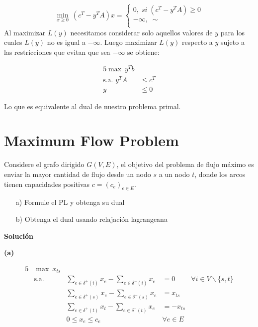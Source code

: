 \documentclass[10pt]{article}
\theoremstyle{plain}
\theoremstyle{definition}
\begin{document}
 \[
    \underset{x\geq0}{\min}\ (c^{T}-y^{T}A)x = \left\{\begin{array}{lr}
        0, \; si \;(c^{T}-y^{T}A)\geq 0\\
        -\infty, \; \sim\\
        \end{array}
  \]
Al maximizar $L(y)$ necesitamos considerar solo aquellos valores de $y$ para los cuales $L(y)$ no es igual a $-\infty$. Luego maximizar $L(y)$ respecto a $y$ sujeto a las restricciones que evitan que sea $-\infty$ se obtiene:

\begin{center}
\begin{alignat*}{5}
\max\  y^{T}b\\
\text{s.a. }  y^{T}A&\leq c^{T}\\
y&\leq 0
\end{alignat*}
\end{center}

Lo que es equivalente al dual de nuestro problema primal.
\section{Maximum Flow Problem}

Considere el grafo dirigido $G(V,E)$, el objetivo del problema de flujo máximo es enviar la mayor cantidad de flujo desde un nodo $s$ a un nodo $t$, donde los arcos tienen capacidades positivas $c = (c_{e})_{e \in E}$.
\begin{itemize}
    \item[a)] Formule el PL y obtenga su dual
    \item[b)] Obtenga el dual usando relajación lagrangeana
\end{itemize}
\textbf{Solución}

\textbf{(a)}\\
\begin{center}
\begin{alignat*}{5}
&\max\ x_{ts}\\
&\text{s.a. } &  \sum_{e\in\delta^{+}(i)}x_{e}-\sum_{e\in\delta^{-}(i)}x_{e} &=0  &\forall i\in V\backslash \{s,t\}\\
&&\sum_{e\in\delta^{+}(s)}x_{e}-\sum_{e\in\delta^{-}(s)}x_{e} &= x_{ts} \\
&&\sum_{e\in\delta^{+}(t)}x_{t}-\sum_{e\in\delta^{-}(t)}x_{e}& =-x_{ts}  \\
&&0\leq x_{e}\leq c_{e} \quad &\forall e\in E
\end{alignat*}
\end{center}
\end{document}
